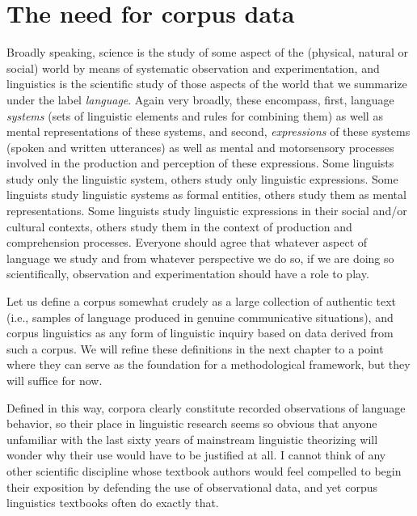 \chapter{The need for corpus data}
\label{ch:needforcorpus}

Broadly speaking, science is the study of some aspect of the (physical, natural or social) world by means of systematic observation  and experimentation,  and linguistics is the scientific study of those aspects of the world that we summarize under the label \textit{language}. Again very broadly, these encompass, first, language \emph{systems} (sets of linguistic elements and rules for combining them) as well as mental representations of these systems, and second, \emph{expressions} of these systems (spoken and written utterances) as well as mental and motorsensory processes involved in the production and perception of these expressions. Some linguists study only the linguistic system, others study only linguistic expressions. Some linguists study linguistic systems as formal entities, others study them as mental representations. Some linguists study linguistic expressions in their social and\slash or cultural  contexts, others study them in the context of production and comprehension processes. Everyone should agree that whatever aspect of language we study and from whatever perspective we do so, if we are doing so scientifically, observation  and experimentation  should have a role to play.

Let us define a corpus somewhat crudely as a large  collection of authentic  text (i.e., samples of language produced in genuine communicative situations), and corpus linguistics as any form of linguistic inquiry based on data derived from such a corpus. We will refine these definitions in the next chapter to a point where they can serve as the foundation for a methodological framework, but they will suffice for now.

Defined in this way, corpora clearly constitute recorded observations  of language behavior, so their place in linguistic research seems so obvious that anyone unfamiliar with the last sixty years of mainstream linguistic theorizing will wonder why their use would have to be justified at all. I cannot think of any other scientific discipline whose textbook authors would feel compelled to begin their exposition by defending the use of observational  data, and yet corpus linguistics textbooks often do exactly that.

